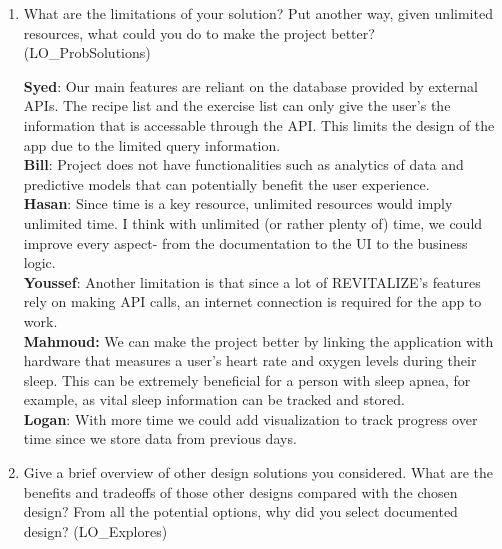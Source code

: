 \documentclass[12pt, titlepage]{article}
\begin{document}
\begin{enumerate}
	\item What are the limitations of your solution?  Put another way, given
	unlimited resources, what could you do to make the project better? (LO\_ProbSolutions)
	
	\textbf{Syed}: Our main features are reliant on the database provided by external APIs. The recipe list and the exercise list can only give the user's the information that is accessable through the API. This limits the design of the app due to the limited query information. \\
	\textbf{Bill}: Project does not have functionalities such as analytics of data and predictive models that can potentially benefit the user experience. \\
	\textbf{Hasan}: Since time is a key resource, unlimited resources would imply unlimited time. I think with unlimited (or rather plenty of) time, we could improve every aspect- from the documentation to the UI to the business logic. \\
	\textbf{Youssef}: Another limitation is that since a lot of REVITALIZE's features rely on making API calls, an internet connection is required for the app to work. \\
	\textbf{Mahmoud:} We can make the project better by linking the application with hardware that measures a user's heart rate and oxygen levels during their sleep. This can be extremely beneficial for a person with sleep apnea, for example, as vital sleep information can be tracked and stored.\\
  \textbf{Logan}: With more time we could add visualization to track progress over time since we store data from previous days.	
	
	
	\item Give a brief overview of other design solutions you considered.  What
	are the benefits and tradeoffs of those other designs compared with the chosen
	design?  From all the potential options, why did you select documented design?
	(LO\_Explores)
	

\end{enumerate}
\end{document}
